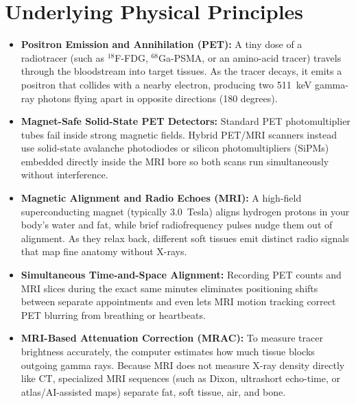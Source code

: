 \section{Underlying Physical Principles}
\begin{itemize}
\item \textbf{Positron Emission and Annihilation (PET):} A tiny dose of a radiotracer (such as $^{18}$F-FDG, $^{68}$Ga-PSMA, or an amino-acid tracer) travels through the bloodstream into target tissues. As the tracer decays, it emits a positron that collides with a nearby electron, producing two 511~keV gamma-ray photons flying apart in opposite directions (180 degrees).
\item \textbf{Magnet-Safe Solid-State PET Detectors:} Standard PET photomultiplier tubes fail inside strong magnetic fields. Hybrid PET/MRI scanners instead use solid-state avalanche photodiodes or silicon photomultipliers (SiPMs) embedded directly inside the MRI bore so both scans run simultaneously without interference.
\item \textbf{Magnetic Alignment and Radio Echoes (MRI):} A high-field superconducting magnet (typically 3.0~Tesla) aligns hydrogen protons in your body's water and fat, while brief radiofrequency pulses nudge them out of alignment. As they relax back, different soft tissues emit distinct radio signals that map fine anatomy without X-rays.
\item \textbf{Simultaneous Time-and-Space Alignment:} Recording PET counts and MRI slices during the exact same minutes eliminates positioning shifts between separate appointments and even lets MRI motion tracking correct PET blurring from breathing or heartbeats.
\item \textbf{MRI-Based Attenuation Correction (MRAC):} To measure tracer brightness accurately, the computer estimates how much tissue blocks outgoing gamma rays. Because MRI does not measure X-ray density directly like CT, specialized MRI sequences (such as Dixon, ultrashort echo-time, or atlas/AI-assisted maps) separate fat, soft tissue, air, and bone.
\end{itemize}

